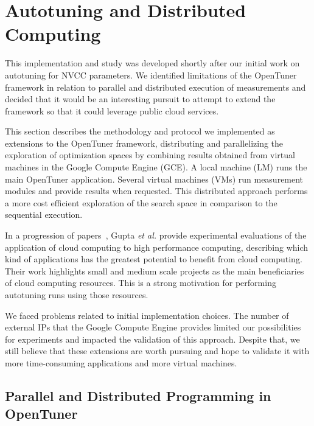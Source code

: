 \section{Autotuning and Distributed Computing}
\label{sec:autotuningCloud}

This implementation and study was developed shortly after our initial work on
autotuning for NVCC parameters. We identified limitations of the OpenTuner
framework in relation to parallel and distributed execution of measurements
and decided that it would be an interesting pursuit to attempt to extend
the framework so that it could leverage public cloud services.

This section describes the methodology and protocol we implemented as
extensions to the OpenTuner framework, distributing and parallelizing the
exploration of optimization spaces by combining results obtained from virtual
machines in the Google Compute Engine (GCE).  A local machine (LM) runs the
main OpenTuner application. Several virtual machines (VMs) run measurement
modules and provide results when requested. This distributed approach performs
a more cost efficient exploration of the search space in comparison to the
sequential execution.

In a progression of
papers~\cite{gupta2012exploring,gupta2014evaluating,gupta2013the}, Gupta
\emph{et al.} provide experimental evaluations of the application of cloud
computing to high performance computing, describing which kind of applications
has the greatest potential to benefit from cloud computing.  Their work
highlights small and medium scale projects as the main beneficiaries of cloud
computing resources. This is a strong motivation for performing autotuning
runs using those resources.

We faced problems related to initial implementation choices. The number of
external IPs that the Google Compute Engine provides limited our possibilities
for experiments and impacted the validation of this approach. Despite that, we
still believe that these extensions are worth pursuing and hope to validate it
with more time-consuming applications and more virtual machines.

\subsection{Parallel and Distributed Programming in OpenTuner}
\label{subsec:parallel}

